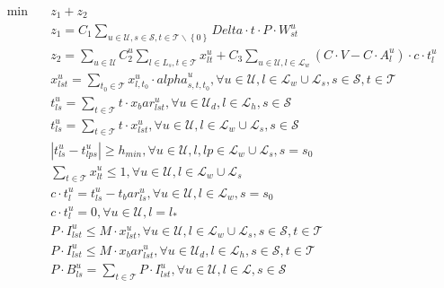 \begin{align}
  \min\quad & z_{1} + z_{2} \tag{eq\_0001} \\
  & z_{1} = C_{1} \sum_{u \in \mathcal{U}, s \in \mathcal{S}, t \in \mathcal{T} \backslash \left\{0\right\}} \mathit{Delta} \cdot t \cdot P \cdot W_{s t}^{u} \tag{eq\_0002} \\
  & z_{2} = \sum_{u \in \mathcal{U}} C_{2}^{u} \sum_{l \in L_{s}, t \in \mathcal{T}} x_{l t}^{u} + C_{3} \sum_{u \in \mathcal{U}, l \in \mathcal{L}_{w}} \left(C \cdot V - C \cdot A_{l}^{u}\right) \cdot c \cdot t_{l}^{u} \tag{eq\_0003} \\
  & x_{l s t}^{u} = \sum_{t_{0} \in \mathcal{T}} x_{l , t_{0}}^{u} \cdot \mathit{alpha}_{s , t , t_{0}}^{u} , \forall u \in \mathcal{U} , l \in \mathcal{L}_{w} \cup \mathcal{L}_{s} , s \in \mathcal{S} , t \in \mathcal{T} \tag{eq\_0004} \\
  & t_{l s}^{u} = \sum_{t \in \mathcal{T}} t \cdot x_bar_{l s t}^{u} , \forall u \in \mathcal{U}_{d} , l \in \mathcal{L}_{h} , s \in \mathcal{S} \tag{eq\_0005} \\
  & t_{l s}^{u} = \sum_{t \in \mathcal{T}} t \cdot x_{l s t}^{u} , \forall u \in \mathcal{U} , l \in \mathcal{L}_{w} \cup \mathcal{L}_{s} , s \in \mathcal{S} \tag{eq\_0006} \\
  & \left|t_{l s}^{u} - t_{lp s}^{u}\right| \geq h_{min} , \forall u \in \mathcal{U} , l , lp \in \mathcal{L}_{w} \cup \mathcal{L}_{s} , s = s_{0} \tag{eq\_0007} \\
  & \sum_{t \in \mathcal{T}} x_{l t}^{u} \leq 1 , \forall u \in \mathcal{U} , l \in \mathcal{L}_{w} \cup \mathcal{L}_{s} \tag{eq\_0008} \\
  & c \cdot t_{l}^{u} = t_{l s}^{u} - t_bar_{l s}^{u} , \forall u \in \mathcal{U} , l \in \mathcal{L}_{w} , s = s_{0} \tag{eq\_0009} \\
  & c \cdot t_{l}^{u} = 0 , \forall u \in \mathcal{U} , l = l_{*} \tag{eq\_0011} \\
  & P \cdot I_{l s t}^{u} \leq M \cdot x_{l s t}^{u} , \forall u \in \mathcal{U} , l \in \mathcal{L}_{w} \cup \mathcal{L}_{s} , s \in \mathcal{S} , t \in \mathcal{T} \tag{eq\_0012} \\
  & P \cdot I_{l s t}^{u} \leq M \cdot x_bar_{l s t}^{u} , \forall u \in \mathcal{U}_{d} , l \in \mathcal{L}_{h} , s \in \mathcal{S} , t \in \mathcal{T} \tag{eq\_0013} \\
  & P \cdot B_{l s}^{u} = \sum_{t \in \mathcal{T}} P \cdot I_{l s t}^{u} , \forall u \in \mathcal{U} , l \in \mathcal{L} , s \in \mathcal{S} \tag{eq\_0014} \\

\end{align}

